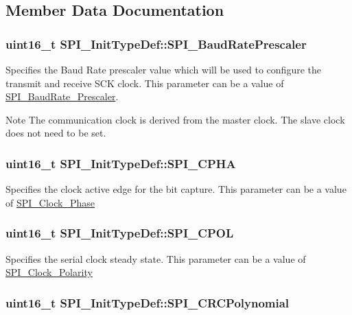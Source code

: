 \subsection{Member Data Documentation}
\hypertarget{structSPI__InitTypeDef_adfcf6178b6a117643111c13403f32e71}{
\subsubsection[{SPI\_\-BaudRatePrescaler}]{\setlength{\rightskip}{0pt plus 5cm}uint16\_\-t {\bf SPI\_\-InitTypeDef::SPI\_\-BaudRatePrescaler}}}
\label{structSPI__InitTypeDef_adfcf6178b6a117643111c13403f32e71}
Specifies the Baud Rate prescaler value which will be used to configure the transmit and receive SCK clock. This parameter can be a value of \hyperlink{group__SPI__BaudRate__Prescaler}{SPI\_\-BaudRate\_\-Prescaler}. \begin{DoxyNote}{Note}
The communication clock is derived from the master clock. The slave clock does not need to be set. 
\end{DoxyNote}
\hypertarget{structSPI__InitTypeDef_acdaac9259c45f137e804f90122edb129}{
\subsubsection[{SPI\_\-CPHA}]{\setlength{\rightskip}{0pt plus 5cm}uint16\_\-t {\bf SPI\_\-InitTypeDef::SPI\_\-CPHA}}}
\label{structSPI__InitTypeDef_acdaac9259c45f137e804f90122edb129}
Specifies the clock active edge for the bit capture. This parameter can be a value of \hyperlink{group__SPI__Clock__Phase}{SPI\_\-Clock\_\-Phase} \hypertarget{structSPI__InitTypeDef_a1fe46794d91fd950e06da06b0e488997}{
\subsubsection[{SPI\_\-CPOL}]{\setlength{\rightskip}{0pt plus 5cm}uint16\_\-t {\bf SPI\_\-InitTypeDef::SPI\_\-CPOL}}}
\label{structSPI__InitTypeDef_a1fe46794d91fd950e06da06b0e488997}
Specifies the serial clock steady state. This parameter can be a value of \hyperlink{group__SPI__Clock__Polarity}{SPI\_\-Clock\_\-Polarity} \hypertarget{structSPI__InitTypeDef_aee6460416ade6c4016aac2bd64cae0eb}{
\subsubsection[{SPI\_\-CRCPolynomial}]{\setlength{\rightskip}{0pt plus 5cm}uint16\_\-t {\bf SPI\_\-InitTypeDef::SPI\_\-CRCPolynomial}}}
